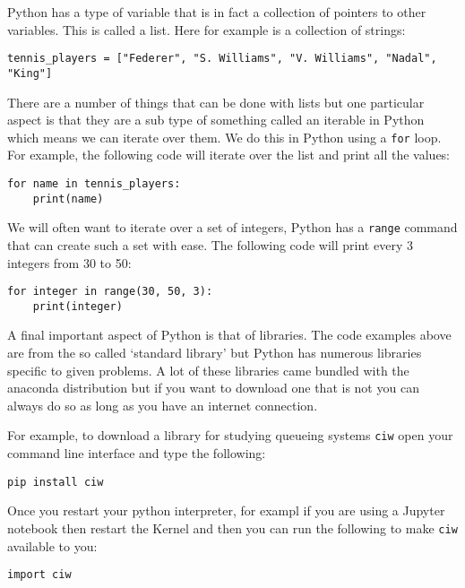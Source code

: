 Python has a type of variable that is in fact a collection of pointers to other
variables. This is called a list. Here for example is a collection of strings:

\begin{verbatim}
tennis_players = ["Federer", "S. Williams", "V. Williams", "Nadal", "King"]
\end{verbatim}

There are a number of things that can be done with lists but one particular
aspect is that they are a sub type of something called an iterable in Python
which means we can iterate over them. We do this in Python using a
\texttt{for} loop. For example, the following code will iterate over
the list and print all the values:

\begin{verbatim}
for name in tennis_players:
    print(name)
\end{verbatim}

We will often want to iterate over a set of integers, Python has a
\texttt{range} command that can create such a set with ease. The following
code will print every 3 integers from 30 to 50:


\begin{verbatim}
for integer in range(30, 50, 3):
    print(integer)
\end{verbatim}

A final important aspect of Python is that of libraries. The code examples above
are from the so called `standard library' but Python has numerous libraries
specific to given problems. A lot of these libraries came bundled with the
anaconda distribution but if you want to download one that is not you can always
do so as long as you have an internet connection.

For example, to download a library for studying queueing systems
\texttt{ciw} open your command line interface and type the
following:

\begin{verbatim}
pip install ciw
\end{verbatim}

Once you restart your python interpreter, for exampl if you are using a Jupyter
notebook then restart the Kernel and then you can run the following to make
\texttt{ciw} available to you:

\begin{verbatim}
import ciw
\end{verbatim}

